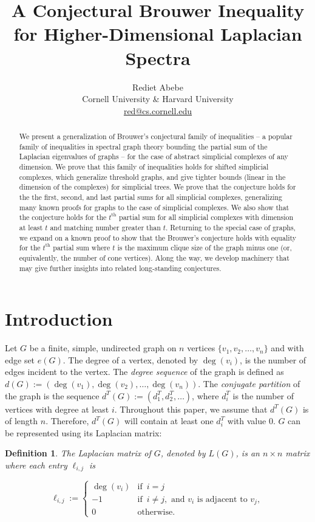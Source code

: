 \documentclass[11pt]{article}
\title{A Conjectural Brouwer Inequality for Higher-Dimensional Laplacian Spectra}
\author{Rediet Abebe \\ Cornell University \& Harvard University \\ \url{red@cs.cornell.edu}}
\newtheorem{defi}[lm]{Definition}
\begin{document}
\maketitle
\begin{abstract}
We present a generalization of Brouwer's conjectural family of inequalities -- a popular family of inequalities in spectral graph theory bounding the partial sum of the Laplacian eigenvalues of graphs -- for the case of abstract simplicial complexes of any dimension. We prove that this family of inequalities holds for shifted simplicial complexes, which generalize threshold graphs, and give tighter bounds (linear in the dimension of the complexes) for simplicial trees. We prove that the conjecture holds for the the first, second, and last partial sums for all simplicial complexes, generalizing many known proofs for graphs to the case of simplicial complexes. We also show that the conjecture holds for the $t^{\text{th}}$ partial sum for all simplicial complexes with dimension at least $t$ and matching number greater than $t$. Returning to the special case of graphs, we expand on a known proof to show that the Brouwer's conjecture holds with equality for the $t^{\text{th}}$ partial sum where $t$ is the maximum clique size of the graph minus one (or, equivalently, the number of cone vertices). Along the way, we develop machinery that may give further insights into related long-standing conjectures.
\end{abstract}


\section{Introduction}\label{sec:intro}

Let $G$ be a finite, simple, undirected graph on $n$ vertices $\{v_1, v_2, \ldots, v_n\}$ and with edge set $e(G)$. The degree of a vertex, denoted by $\deg(v_i)$, is the number of edges incident to the vertex. The \emph{degree sequence} of the graph is defined as $d(G) := \left( { \deg(v_1), \deg(v_2), \ldots, \deg(v_n) } \right)$. The \emph{conjugate partition} of the graph is the sequence $d^{T}(G) := \left( { d^{T}_1, d^{T}_2, \ldots } \right)$, where $d^{T}_i$ is the number of vertices with degree at least $i$. Throughout this paper, we assume that $d^T(G)$ is of length $n$. Therefore, $d^T(G)$ will contain at least one $d_i^T$ with value $0$. $G$ can be represented using its Laplacian matrix:


\begin{defi}
The \emph{Laplacian matrix} of $G$, denoted by $L(G)$, is an $n \times n$ matrix where each entry $\ell_{i, j}$ is

\[
\ell_{i, j} := \begin{cases} \deg(v_i) & \text{if }\, i = j \\-1 & \text{if }\, i \neq j, \text{ and } v_i \text{ is adjacent to } v_j, \\0 & \text{otherwise.}\end{cases}
\]

\end{defi}
\end{document}
